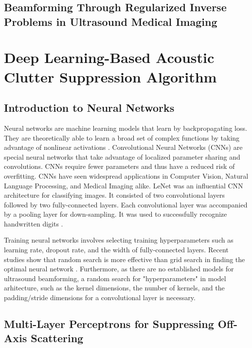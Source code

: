 \subsection{Beamforming Through Regularized Inverse Problems in Ultrasound Medical Imaging}
\cite{szasz_regularized_inverse}

\section{Deep Learning-Based Acoustic Clutter Suppression Algorithm} %

\subsection{Introduction to Neural Networks}

Neural networks are machine learning models that learn by backpropagating loss. They are theoretically able to learn a broad set of complex functions by taking advantage of nonlinear activations \cite{rumelhart1985learning}. Convolutional Neural Networks (CNNs) are special neural networks that take advantage of localized parameter sharing and convolutions. CNNs require fewer parameters and thus have a reduced risk of overfitting. CNNs have seen widespread applications in Computer Vision, Natural Language Processing, and Medical Imaging alike. LeNet was an influential CNN architecture for classifying images. It consisted of two convolutional layers followed by two fully-connected layers. Each convolutional layer was accompanied by a pooling layer for down-sampling. It was used to successfully recognize handwritten digits \cite{lenet}.

Training neural networks involves selecting training hyperparameters such as learning rate, dropout rate, and the width of fully-connected layers. Recent studies show that random search is more effective than grid search in finding the optimal neural network \cite{bergstra2012random}. Furthermore, as there are no established models for ultrasound beamforming, a random search for "hyperparameters" in model arhitecture, such as the kernel dimensions, the number of kernels, and the padding/stride dimensions for a convolutional layer is necessary.


\subsection{Multi-Layer Perceptrons for Suppressing Off-Axis Scattering}

